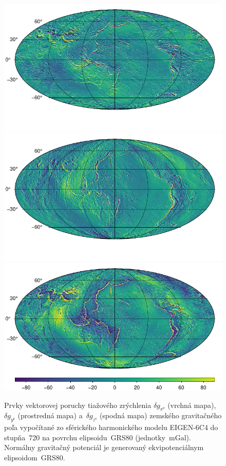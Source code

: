 \documentclass[a4paper, 12pt]{book}
\begin{document}
\begin{figure}
\centering
\includegraphics{./fig-gravity-disturbance-on-grs80-x.pdf}
\includegraphics{./fig-gravity-disturbance-on-grs80-y.pdf}
\includegraphics{./fig-gravity-disturbance-on-grs80-z.pdf}
\caption{Prvky vektorovej poruchy tiažového zrýchlenia $\delta 
g_{x^\mathrm{s}}$ (vrchná mapa), $\delta g_{y^\mathrm{s}}$ (prostredná mapa) 
a~$\delta g_{z^\mathrm{s}}$ (spodná mapa) zemského gravitačného poľa vypočítané 
zo sférického harmonického modelu EIGEN-6C4 do stupňa~720 na povrchu 
elipsoidu~GRS80 (jednotky~$\mathrm{mGal}$).  Normálny gravitačný potenciál je 
generovaný ekvipotenciálnym elipsoidom~GRS80.}
\label{fig:dg_ggm_grs80}
\end{figure}
\end{document}
